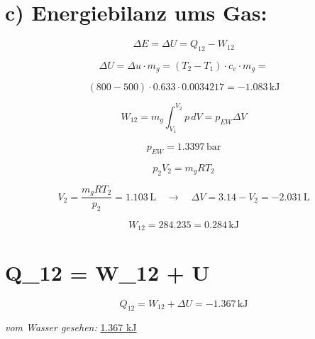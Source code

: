 \section*{c) Energiebilanz ums Gas:}

\[
\Delta E = \Delta U = Q_{12} - W_{12}
\]

\[
\Delta U = \Delta u \cdot m_g = (T_2 - T_1) \cdot c_v \cdot m_g = 
\]

\[
(800 - 500) \cdot 0.633 \cdot 0.0034217 = -1.083 \, \text{kJ}
\]

\[
W_{12} = m_g \int_{V_1}^{V_2} p \, dV = p_{EW} \Delta V
\]

\[
p_{EW} = 1.3397 \, \text{bar}
\]

\[
p_2 V_2 = m_g R T_2
\]

\[
V_2 = \frac{m_g R T_2}{p_2} = 1.103 \, \text{L} \quad \longrightarrow \quad \Delta V = 3.14 - V_2 = -2.031 \, \text{L}
\]

\[
W_{12} = 284.235 = 0.284 \, \text{kJ}
\]

\section*{Q_{12} = W_{12} + \Delta U}

\[
Q_{12} = W_{12} + \Delta U = -1.367 \, \text{kJ}
\]

\textit{vom Wasser gesehen:} \underline{1.367 kJ}